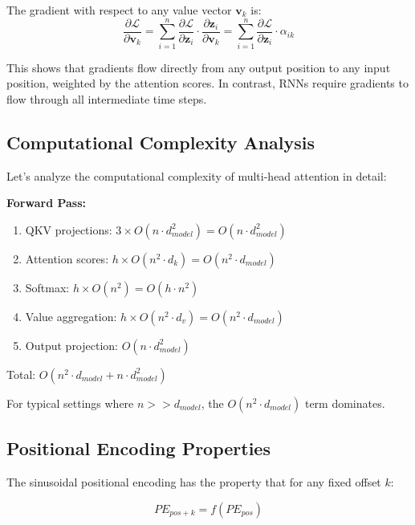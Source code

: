 \documentclass[11pt]{article}
\begin{document}
The gradient with respect to any value vector $\mathbf{v}_k$ is:
\begin{equation}
\frac{\partial \mathcal{L}}{\partial \mathbf{v}_k} = \sum_{i=1}^{n} \frac{\partial \mathcal{L}}{\partial \mathbf{z}_i} \cdot \frac{\partial \mathbf{z}_i}{\partial \mathbf{v}_k} = \sum_{i=1}^{n} \frac{\partial \mathcal{L}}{\partial \mathbf{z}_i} \cdot \alpha_{ik}
\end{equation}

This shows that gradients flow directly from any output position to any input position, weighted by the attention scores. In contrast, RNNs require gradients to flow through all intermediate time steps.

\subsection{Computational Complexity Analysis}

Let's analyze the computational complexity of multi-head attention in detail:

\textbf{Forward Pass:}
\begin{enumerate}
    \item QKV projections: $3 \times O(n \cdot d_{model}^2) = O(n \cdot d_{model}^2)$
    \item Attention scores: $h \times O(n^2 \cdot d_k) = O(n^2 \cdot d_{model})$
    \item Softmax: $h \times O(n^2) = O(h \cdot n^2)$
    \item Value aggregation: $h \times O(n^2 \cdot d_v) = O(n^2 \cdot d_{model})$
    \item Output projection: $O(n \cdot d_{model}^2)$
\end{enumerate}

Total: $O(n^2 \cdot d_{model} + n \cdot d_{model}^2)$

For typical settings where $n >> d_{model}$, the $O(n^2 \cdot d_{model})$ term dominates.

\subsection{Positional Encoding Properties}

The sinusoidal positional encoding has the property that for any fixed offset $k$:

\begin{equation}
PE_{pos+k} = f(PE_{pos})
\end{equation}
\end{document}
